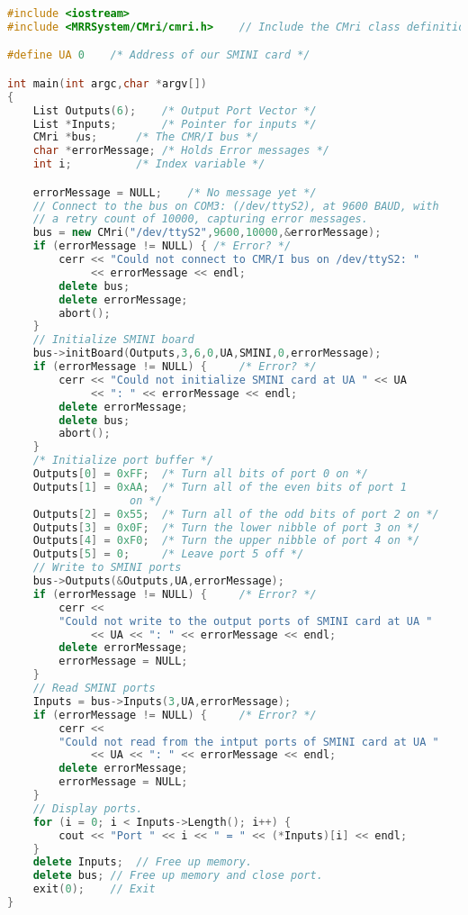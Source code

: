 \begin{lstlisting}[caption={Using the CMR/I from C++},
		   language=C++,
		   label=lst:CMRI:Cpp1]
#include <iostream>
#include <MRRSystem/CMri/cmri.h>	// Include the CMri class definition

#define UA 0	/* Address of our SMINI card */

int main(int argc,char *argv[])
{
	List Outputs(6);	/* Output Port Vector */
	List *Inputs;		/* Pointer for inputs */
	CMri *bus;		/* The CMR/I bus */
	char *errorMessage;	/* Holds Error messages */
	int i;			/* Index variable */

	errorMessage = NULL;	/* No message yet */
	// Connect to the bus on COM3: (/dev/ttyS2), at 9600 BAUD, with
	// a retry count of 10000, capturing error messages.
	bus = new CMri("/dev/ttyS2",9600,10000,&errorMessage);
	if (errorMessage != NULL) {	/* Error? */
		cerr << "Could not connect to CMR/I bus on /dev/ttyS2: " 
		     << errorMessage << endl;
		delete bus;
		delete errorMessage;
		abort();
	}
	// Initialize SMINI board
	bus->initBoard(Outputs,3,6,0,UA,SMINI,0,errorMessage);
	if (errorMessage != NULL) {     /* Error? */  
		cerr << "Could not initialize SMINI card at UA " << UA
		     << ": " << errorMessage << endl;
		delete errorMessage;
		delete bus;
		abort();
	}
	/* Initialize port buffer */
	Outputs[0] = 0xFF;	/* Turn all bits of port 0 on */
	Outputs[1] = 0xAA;	/* Turn all of the even bits of port 1
				   on */
	Outputs[2] = 0x55;	/* Turn all of the odd bits of port 2 on */
	Outputs[3] = 0x0F;	/* Turn the lower nibble of port 3 on */
	Outputs[4] = 0xF0;	/* Turn the upper nibble of port 4 on */
	Outputs[5] = 0;		/* Leave port 5 off */
	// Write to SMINI ports
	bus->Outputs(&Outputs,UA,errorMessage);
	if (errorMessage != NULL) {     /* Error? */
		cerr << 
		"Could not write to the output ports of SMINI card at UA " 
		     << UA << ": " << errorMessage << endl;
		delete errorMessage;
		errorMessage = NULL;
	}
	// Read SMINI ports
	Inputs = bus->Inputs(3,UA,errorMessage);
	if (errorMessage != NULL) {     /* Error? */
		cerr <<
		"Could not read from the intput ports of SMINI card at UA "
		     << UA << ": " << errorMessage << endl;
		delete errorMessage;
		errorMessage = NULL;
	}
	// Display ports.
	for (i = 0; i < Inputs->Length(); i++) {
		cout << "Port " << i << " = " << (*Inputs)[i] << endl;
	}
	delete Inputs; 	// Free up memory.
	delete bus;	// Free up memory and close port.
	exit(0);	// Exit
}
\end{lstlisting}
